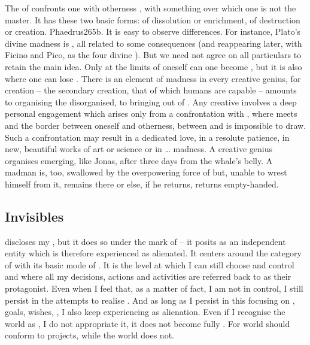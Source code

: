 The  of  confronts one with otherness
, with something over which one is not the master. It has these two
basic forms: of dissolution or enrichment, of destruction or creation.
\citet{And of madness there [are] two kinds; one produced by human infirmity,
  the other [is] a divine release of the soul from the yoke of custom and
  convention.}{Phaedrus}{265b. It is easy to observe
  differences.  For instance, Plato's divine madness is , all related to some
   consequences (and reappearing later, with
  Ficino and Pico, as the four divine ). But we need not
  agree on all particulars to retain the main idea.} Only at the limits of
{oneself} can one become , but it is also where one can lose
. There is an element of madness in every creative genius, for
creation -- the secondary creation, that of which humans are capable -- amounts
to organising the disorganised, to bringing  out of .
Any creative  involves a deep personal engagement which arises only
from a confrontation with , where  meets  and the
border between oneself and otherness, between  and  is
impossible to draw.  Such a confrontation may result in a dedicated love, in a
resolute patience, in new, beautiful works of art or science or in \ldots
madness.  A creative genius organises  emerging, like Jonas, after
three days from the whale's belly.  A madman is, too, swallowed by the
overpowering force of  but, unable to wrest himself from it, remains
there or else, if he returns, returns empty-handed.

\subsection{Invisibles}\label{sec:levelD}


\pa {} discloses my , but it does so under the
mark of   -- it posits  as an
independent entity which is therefore experienced as alienated. It centers
around the category of  with its basic mode of .  It is
the level at which I can still choose and control and where all my decisions,
actions and activities are referred back to  as their protagonist.
Even when I feel that, as a matter of fact, I am not in control, I still persist
in the attempts to realise .  And as long as I persist in this
focusing on ,  goals,  wishes, , I also
keep experiencing  as alienation. Even if I recognise the world
as , I do not appropriate it, it does not become fully .
For  world should conform to  projects, while the world does not.

